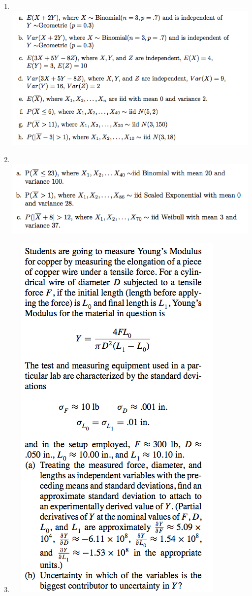 \documentclass{article}\usepackage{graphicx, color}
\providecommand{\q}{$\quad$ \newline}
\numberwithin{equation}{section}
\begin{document}
\begin{flushleft}
\begin{enumerate}[1. ]
\item \q
{} \includegraphics{../../fig/h7p3.png}
\item \q
{} \includegraphics{../../fig/h7p4.png}


\item \q
{} \includegraphics{../../fig/h7p5p1-1.png}




\end{enumerate}
\end{flushleft}
\end{document}
